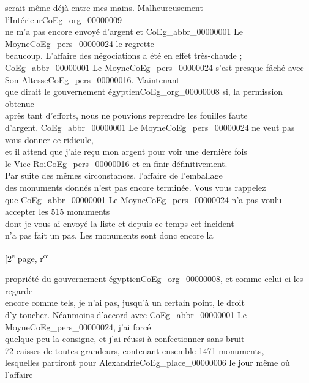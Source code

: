 \documentclass{book}
\begin{document}
serait même déjà entre mes mains. Malheureusement l’Intérieur\gls{CoEg_org_00000009}\\
ne m’a pas encore envoyé d’argent et \gls{CoEg_abbr_00000001} Le Moyne\gls{CoEg_pers_00000024} le regrette\\
beaucoup. L’affaire des négociations a été en effet très-chaude ;\\
\gls{CoEg_abbr_00000001} Le Moyne\gls{CoEg_pers_00000024} s’est presque fâché avec Son Altesse\gls{CoEg_pers_00000016}. Maintenant\\
que dirait le gouvernement égyptien\gls{CoEg_org_00000008} si, la permission obtenue\\
après tant d’efforts, nous ne pouvions reprendre les fouilles faute\\
d’argent. \gls{CoEg_abbr_00000001} Le Moyne\gls{CoEg_pers_00000024} ne veut pas vous donner ce ridicule,\\
et il attend que j’aie reçu mon argent pour voir une dernière fois\\
le Vice-Roi\gls{CoEg_pers_00000016} et en finir définitivement.\\
\indent Par suite des mêmes circonstances, l’affaire de l’emballage\\
des monuments donnés n’est pas encore terminée. Vous vous rappelez\\
que \gls{CoEg_abbr_00000001} Le Moyne\gls{CoEg_pers_00000024} n’a pas voulu accepter les 515 monuments\\
dont je vous ai envoyé la liste et depuis ce temps cet incident\\
n’a pas fait un pas. Les monuments sont donc encore la
{\footnotesize \begin{center} [2\textsuperscript{e} page, r\textsuperscript{o}]\end{center}}
\noindent propriété du gouvernement égyptien\gls{CoEg_org_00000008}, et comme celui-ci les regarde\\
encore comme tels, je n’ai pas, jusqu’à un certain point, le droit\\
d’y toucher. Néanmoins d’accord avec \gls{CoEg_abbr_00000001} Le Moyne\gls{CoEg_pers_00000024}, j’ai forcé\\
quelque peu la consigne, et j’ai réussi à confectionner sans bruit\\
72 caisses de toutes grandeurs, contenant ensemble 1471 monuments,\\
lesquelles partiront pour Alexandrie\gls{CoEg_place_00000006} le jour même où l’affaire\\
\end{document}
